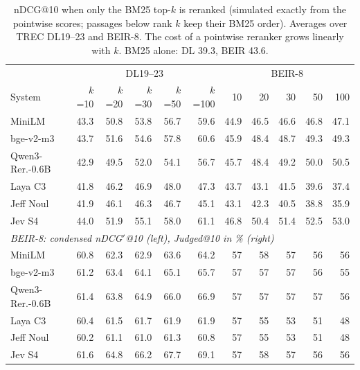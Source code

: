 \begin{table}[tp]
\centering
\scriptsize
\setlength{\tabcolsep}{3pt}
\caption{nDCG@10 when only the BM25 top-$k$ is reranked (simulated exactly from the pointwise scores; passages below rank $k$ keep their BM25 order). Averages over TREC DL19--23 and BEIR-8. The cost of a pointwise reranker grows linearly with $k$. BM25 alone: DL 39.3, BEIR 43.6.}
\label{tab:depth}
\begin{tabular}{lrrrrr|rrrrr}
\toprule
 & \multicolumn{5}{c|}{DL19--23} & \multicolumn{5}{c}{BEIR-8} \\
System & $k$=10 & $k$=20 & $k$=30 & $k$=50 & $k$=100 & 10 & 20 & 30 & 50 & 100 \\
\midrule
MiniLM & 43.3 & 50.8 & 53.8 & 56.7 & 59.6 & 44.9 & 46.5 & 46.6 & 46.8 & 47.1 \\
bge-v2-m3 & 43.7 & 51.6 & 54.6 & 57.8 & 60.6 & 45.9 & 48.4 & 48.7 & 49.3 & 49.3 \\
Qwen3-Rer.-0.6B & 42.9 & 49.5 & 52.0 & 54.1 & 56.7 & 45.7 & 48.4 & 49.2 & 50.0 & 50.5 \\
Laya C3 & 41.8 & 46.2 & 46.9 & 48.0 & 47.3 & 43.7 & 43.1 & 41.5 & 39.6 & 37.4 \\
Jeff Noul & 41.9 & 46.1 & 46.3 & 46.7 & 45.1 & 43.1 & 42.3 & 40.5 & 38.8 & 35.9 \\
Jev S4 & 44.0 & 51.9 & 55.1 & 58.0 & 61.1 & 46.8 & 50.4 & 51.4 & 52.5 & 53.0 \\
\midrule
\multicolumn{11}{l}{\textit{BEIR-8: condensed nDCG$'$@10 (left), Judged@10 in \% (right)}} \\
MiniLM & 60.8 & 62.3 & 62.9 & 63.6 & 64.2 & 57 & 58 & 57 & 56 & 56 \\
bge-v2-m3 & 61.2 & 63.4 & 64.1 & 65.1 & 65.7 & 57 & 57 & 57 & 56 & 55 \\
Qwen3-Rer.-0.6B & 61.4 & 63.8 & 64.9 & 66.0 & 66.9 & 57 & 57 & 57 & 57 & 56 \\
Laya C3 & 60.4 & 61.5 & 61.7 & 61.9 & 61.9 & 57 & 55 & 53 & 51 & 48 \\
Jeff Noul & 60.2 & 61.1 & 61.0 & 61.3 & 60.8 & 57 & 55 & 53 & 51 & 48 \\
Jev S4 & 61.6 & 64.8 & 66.2 & 67.7 & 69.1 & 57 & 58 & 57 & 56 & 56 \\
\bottomrule
\end{tabular}
\end{table}